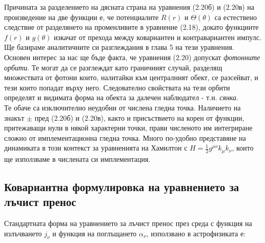 Причината за разделението на дясната страна на уравнения (2.20б) и (2.20в) на произведение на две функции е, че потенциалите $R(r)$ и $\Theta(\theta)$ са естествено следствие от разделянето на променливите в уравнение (2.18), докато функциите $f(r)$ и $g(\theta)$ изкачат от прехода между ковариантен и контравариантен импулс. Ще базираме аналитичните си разглеждания в глава 5 на тези уравнения.\\\newline
Основен интерес за нас ще бъде факта, че уравнения (2.20) допускат \emph{фотонните орбити}. Те могат да се разглеждат като граничният случай, разделящ множествата от фотони които, налитайки към централният обект, се разсейват, и тези които попадат върху него. Следователно свойствата на тези орбити определят и видимата форма на обекта за далечен наблюдател - т.н. \emph{сянка}.\\\newline
{}
Те обаче са изключително неудобни от числена гледна точка. Наличието на знакът $\pm$ пред (2.20б) и (2.20в), както и присъствието на корен от функции, притежаващи нули в някой характерни точки, прави численото им интегриране сложно от имплементационна гледна точка. Много по-удобно представяне на динамиката в този контекст за уравненията на Хамилтон с $H = \frac{1}{2}g^{\mu\nu}k_\mu k_\nu$, които ще използваме в числената си имплементация.

\lfoot{}
\subsection{Ковариантна формулировка на уравнението за лъчист пренос}

Стандартната форма на уравнението за лъчист пренос през среда с функция на излъчването $j_\nu$ и функция на поглъщането $\alpha_\nu$, използвано в астрофизиката е:


